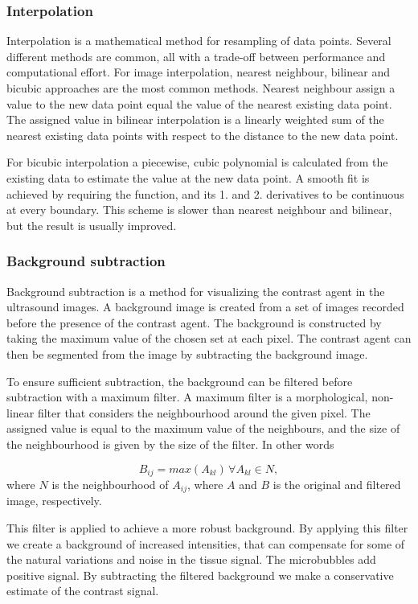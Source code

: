\subsubsection{Interpolation}
Interpolation is a mathematical method for resampling of data points. Several different methods are common, all with a trade-off between performance and computational effort. For image interpolation, nearest neighbour, bilinear and bicubic approaches are the most common methods. Nearest neighbour assign a value to the new data point equal the value of the nearest existing data point. The assigned value in bilinear interpolation is a linearly weighted sum of the nearest existing data points with respect to the distance to the new data point. 

For bicubic interpolation a piecewise, cubic polynomial is calculated from the existing data to estimate the value at the new data point. A smooth fit is achieved by requiring the function, and its 1. and 2. derivatives to be continuous at every boundary. This scheme is slower than nearest neighbour and bilinear, but the result is usually improved.  

\subsubsection{Background subtraction}
Background subtraction is a method for visualizing the contrast agent in the ultrasound images. A background image is created from a set of images recorded before the presence of the contrast agent. The background is constructed by taking the maximum value of the chosen set at each pixel. The contrast agent can then be segmented from the image by subtracting the background image. 

To ensure sufficient subtraction, the background can be filtered before subtraction with a maximum filter. A maximum filter is a morphological, non-linear filter that considers the neighbourhood around the given pixel. The assigned value is equal to the maximum value of the neighbours, and the size of the neighbourhood is given by the size of the filter. In other words

\begin{equation}
B_{ij} = max(A_{kl})\, \forall A_{kl} \in N,
\end{equation}
where $N$ is the neighbourhood of $A_{ij}$, where $A$ and $B$ is the original and filtered image, respectively. 

This filter is applied to achieve a more robust background. By applying this filter we create a background of increased intensities, that can compensate for some of the natural variations and noise in the tissue signal. The microbubbles add positive signal. By subtracting the filtered background we make a conservative estimate of the contrast signal. 

